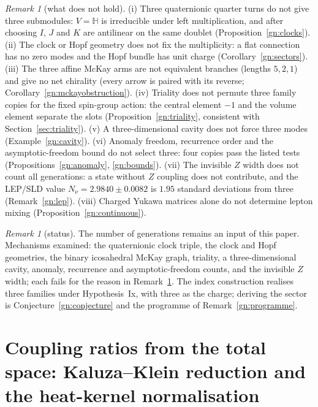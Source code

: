 \documentclass[aps,pra,onecolumn,superscriptaddress,nofootinbib,10pt]{revtex4-2}
\theoremstyle{definition}
\theoremstyle{remark}
\newtheorem{remark}[theorem]{Remark}
\newcommand{\HH}{\mathbb{H}}
\begin{document}
\begin{remark}[what does not hold]\label{rem:gnnogo}
(i) Three quaternionic quarter turns do not give three submodules: $V=\HH$ is irreducible under left
multiplication, and after choosing $I$, $J$ and $K$ are antilinear on the same doublet (Proposition~\ref{gn:clocks}).
(ii) The clock or Hopf geometry does not fix the multiplicity: a flat connection has no zero modes and the Hopf
bundle has unit charge (Corollary~\ref{gn:sectors}).  (iii) The three affine McKay arms are not equivalent
branches (lengths $5,2,1$) and give no net chirality (every arrow is paired with its reverse;
Corollary~\ref{gn:mckayobstruction}).  (iv) Triality does not permute three family copies for the fixed spin-group
action: the central element $-1$ and the volume element separate the slots (Proposition~\ref{gn:triality},
consistent with Section~\ref{sec:triality}).  (v) A three-dimensional cavity does not force three modes
(Example~\ref{gn:cavity}).  (vi) Anomaly freedom, recurrence order and the asymptotic-freedom bound do not select
three: four copies pass the listed tests (Propositions~\ref{gn:anomaly}, \ref{gn:bounds}).  (vii) The invisible
$Z$ width does not count all generations: a state without $Z$ coupling does not contribute, and the LEP/SLD value
$N_\nu=2.9840\pm0.0082$ is $1.95$ standard deviations from three \cite{gn:lepsource} (Remark~\ref{gn:lep}).  (viii) Charged
Yukawa matrices alone do not determine lepton mixing (Proposition~\ref{gn:continuous}).
\end{remark}

\begin{remark}[status]\label{rem:gnstatus}
The number of generations remains an input of this paper.  Mechanisms examined: the quaternionic clock
triple, the clock and Hopf geometries, the binary icosahedral McKay graph, triality, a three-dimensional
cavity, anomaly, recurrence and asymptotic-freedom counts, and the invisible $Z$ width; each fails for the
reason in Remark~\ref{rem:gnnogo}.  The index construction realises three families under Hypothesis~Ix, with
three as the charge; deriving the sector is Conjecture~\ref{gn:conjecture} and the programme of
Remark~\ref{gn:programme}.
\end{remark}

\section{Coupling ratios from the total space: Kaluza--Klein reduction and the heat-kernel normalisation}\label{sec:couplings}
\end{document}
